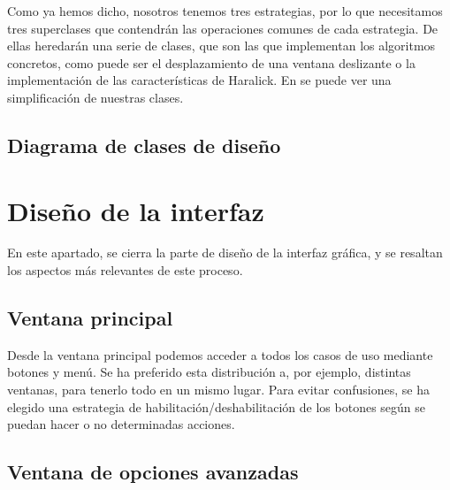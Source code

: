 Como ya hemos dicho, nosotros tenemos tres estrategias, por lo que necesitamos tres superclases que contendrán las operaciones comunes de cada estrategia. De ellas heredarán una serie de clases, que son las que implementan los algoritmos concretos, como puede ser el desplazamiento de una ventana deslizante o la implementación de las características de Haralick. En  se puede ver una simplificación de nuestras clases.


\newpage

\subsection{Diagrama de clases de diseño}


\newpage

\section{Diseño de la interfaz}
En este apartado, se cierra la parte de diseño de la interfaz gráfica, y se resaltan los aspectos más relevantes de este proceso.

\subsection{Ventana principal}


Desde la ventana principal podemos acceder a todos los casos de uso mediante botones y menú. Se ha preferido esta distribución a, por ejemplo, distintas ventanas, para tenerlo todo en un mismo lugar. Para evitar confusiones, se ha elegido una estrategia de habilitación/deshabilitación de los botones según se puedan hacer o no determinadas acciones.

\subsection{Ventana de opciones avanzadas}


